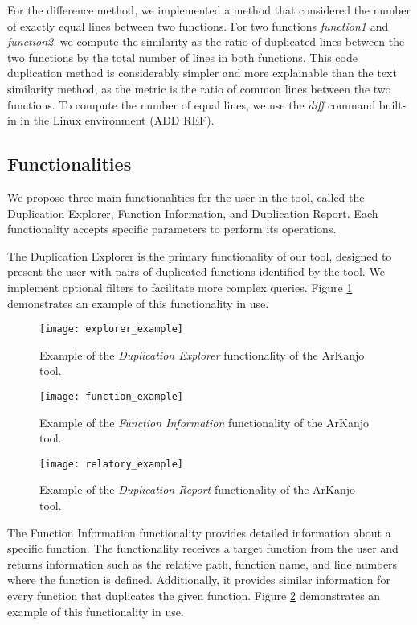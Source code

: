 \documentclass[conference]{IEEEtran}
\begin{document}
For the difference method, 
we implemented a method that considered the number of exactly equal lines between two functions.
For two functions \textit{function1} and \textit{function2}, we compute the similarity as the 
ratio of duplicated lines between the two functions by the total number of lines in both functions.
This code duplication method is considerably simpler and more explainable than the text similarity method, 
as the metric is the ratio of common lines between the two functions. To compute the number of equal lines, we use
the \textit{diff} command built-in in the Linux environment (ADD REF).

\subsection{Functionalities}

We propose three main functionalities for the user in the tool, called the Duplication
Explorer, Function Information, and Duplication Report. Each functionality accepts
specific parameters to perform its operations.

The Duplication Explorer is the primary functionality of our tool, designed to present
the user with pairs of duplicated functions identified by the tool. We implement optional
filters to facilitate more complex queries. Figure \ref{fig:explorer_ex} demonstrates an
example of this functionality in use.

\begin{figure}[!t]
\centering
\texttt{[image: explorer\_example]}
\caption{Example of the \textit{Duplication Explorer} functionality of the ArKanjo tool.}
\label{fig:explorer_ex}
\end{figure}

\begin{figure}[!t]
\centering
\texttt{[image: function\_example]}
\caption{Example of the \textit{Function Information} functionality of the ArKanjo tool.}
\label{fig:function_ex}
\end{figure}

\begin{figure}[!t]
\centering
\texttt{[image: relatory\_example]}
\caption{Example of the \textit{Duplication Report} functionality of the ArKanjo tool.}
\label{fig:relatory_ex}
\end{figure}


The Function Information functionality provides detailed information about a specific function. 
The functionality receives a target function from the user
and returns information such as the relative path, function name, and line numbers where
the function is defined. Additionally, it provides similar information for every function
that duplicates the given function. Figure \ref{fig:function_ex} demonstrates an
example of this functionality in use.
\end{document}
